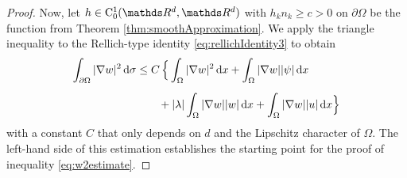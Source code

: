 \begin{proof}
  Now, let $h \in \CC_0^1(\R^d, \R^d)$ with $h_k n_k \geq c > 0$ on $\partial \Omega$ be the function from Theorem \ref{thm:smoothApproximation}.
  We apply the triangle inequality to the Rellich-type identity \eqref{eq:rellichIdentity3} to obtain
  \begin{align}
\label{eq:rellichInequality3}
      \begin{alignedat}{2}
    \int_{\partial\Omega} |\nabla w|^2 \, {\operatorname{d}\!{\sigma}} 
    &\leq C \, \Big\{ \int_\Omega |\nabla w|^2 \, {\operatorname{d}\!{x}} + \int_\Omega |\nabla w | |\psi| \, {\operatorname{d}\!{x}} \\[0.5em]
    &\qquad + |\lambda| \int_\Omega |\nabla w| |w| \, {\operatorname{d}\!{x}} + \int_\Omega |\nabla w| |u| \, {\operatorname{d}\!{x}} \Big\}
\end{alignedat}
  \end{align}
  with a constant $C$ that only depends on $d$ and the Lipschitz character of $\Omega$.
  The left-hand side of this estimation establishes the starting point for the proof of inequality \ref{eq:w2estimate}.


\end{proof}
